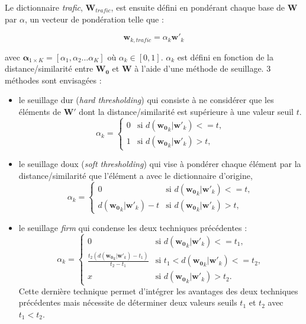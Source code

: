Le dictionnaire \textit{trafic}, $\mathbf{W}_{trafic}$, est ensuite défini en pondérant chaque base de $\mathbf{W}$ par $\alpha$, un vecteur de pondération telle que : 

\begin{equation}
\mathbf{w}_{k,trafic} = \alpha_k \mathbf{w'}_k
\end{equation}

avec $\mathbf{\alpha}_{1 \times K} = \left[\alpha_1, \alpha_2 \dots \alpha_K \right]$ où $\alpha_k \in \left[0,1 \right]$. $\alpha_k$ est défini en fonction de la distance/similarité entre $\mathbf{W_0}$ et $\mathbf{W}$ à l'aide d'une méthode de seuillage. 3 méthodes sont envisagées : 

\begin{itemize}
\item le seuillage dur (\textit{hard thresholding}) \cite{donoho1994threshold} qui consiste à ne considérer que les éléments de $\mathbf{W'}$ dont la distance/similarité est supérieure à une valeur seuil $t$. 
\begin{equation*}
  \alpha_k =
     \begin{cases}
        0 & \text{si } d(\mathbf{w_0}_k\vert \mathbf{w'}_k) <= t,  \\
        1 & \text{si } d(\mathbf{w_0}_k\vert \mathbf{w'}_k) > t, 
     \end{cases}
\end{equation*}
\item le seuillage doux (\textit{soft thresholding}) \cite{donoho1995noising} qui vise à pondérer chaque élément par la distance/similarité que l'élément a avec le dictionnaire d'origine, 
\begin{equation*}
  \alpha_k =
     \begin{cases}
        0 & \text{si } d(\mathbf{w_0}_k\vert \mathbf{w'}_k) <= t,  \\
        d(\mathbf{w_0}_k\vert \mathbf{w'}_k)-t  & \text{si } d(\mathbf{w_0}_k\vert \mathbf{w'}_k) > t, 
     \end{cases}
\end{equation*}

\item le seuillage \textit{firm} \cite{fornasier2008iterative} qui condense les deux techniques précédentes : 
\begin{equation*}
  \alpha_k =
     \begin{cases}
        0 & \text{si } d(\mathbf{w_0}_k\vert \mathbf{w'}_k) <= t_1,  \\
        \frac{t_2(d(\mathbf{w_0}_k\vert \mathbf{w'}_k)-t_1)}{t_2-t_1}  & \text{si } t_1 < d(\mathbf{w_0}_k\vert \mathbf{w'}_k) <= t_2,  \\
        x & \text{si } d(\mathbf{w_0}_k\vert \mathbf{w'}_k) > t_2.
     \end{cases}
\end{equation*}
Cette dernière technique permet d'intégrer les avantages des deux techniques précédentes mais nécessite de déterminer deux valeurs seuils $t_1$ et $t_2$ avec $t_1 < t_2$. \\
\end{itemize}

